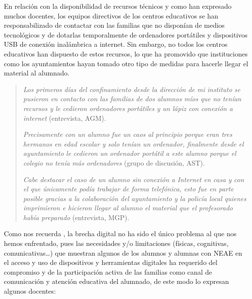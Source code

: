 \documentclass{textolivre}
\begin{document}
En relación con la disponibilidad de recursos técnicos y como han expresado muchos docentes, los equipos directivos de los centros educativos se han responsabilizado de contactar con las familias que no disponían de medios tecnológicos y de dotarlas temporalmente de ordenadores portátiles y dispositivos USB de conexión inalámbrica a internet. Sin embargo, no todos los centros educativos han dispuesto de estos recursos, lo que ha promovido que instituciones como los ayuntamientos hayan tomado otro tipo de medidas para hacerle llegar el material al alumnado.

\begin{quote}
\emph{Los primeros días del confinamiento desde la dirección de mi instituto se pusieron en contacto con las familias de dos alumnos míos que no tenían recursos y le cedieron ordenadores portátiles y un lápiz con conexión a internet} (entrevista, AGM). 

\emph{Precisamente con un alumno fue un caos al principio porque eran tres hermanos en edad escolar y solo tenían un ordenador, finalmente desde el ayuntamiento le cedieron un ordenador portátil a este alumno porque el colegio no tenía más ordenadores} (grupo de discusión, AST).

\emph{Cabe destacar el caso de un alumno sin conexión a Internet en casa y con el que únicamente podía trabajar de forma telefónica, esto fue en parte posible gracias a la colaboración del ayuntamiento y la policía local quienes imprimieron e hicieron llegar al alumno el material que el profesorado había preparado} (entrevista, MGP).
\end{quote}

Como nos recuerda \textcite{mur2016}, %
la brecha digital no ha sido el único problema al que nos hemos enfrentado, pues las necesidades y/o limitaciones (físicas, cognitivas, comunicativas…) que muestran algunos de los alumnos y alumnas con NEAE en el acceso y uso de dispositivos y herramientas digitales ha requerido del compromiso y de la participación activa de las familias como canal de comunicación y atención educativa del alumnado, de este modo lo expresan algunos docentes:
\end{document}
